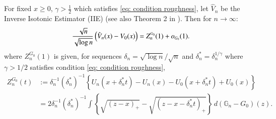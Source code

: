     \begin{lemma}\label{supp:lemma: asymptotic linearity iso estimator}
		For fixed $x \geq 0$, $\gamma > \frac{1}{2}$ which satisfies \eqref{eq: condition roughness}, let $\hat{V}_n$ be the Inverse Isotonic Estimator (IIE) (see also Theorem 2 in \cite{27}). Then for $n \rightarrow \infty$:
		\begin{align*}
			\frac{\sqrt{n}}{\sqrt{\log{n}}} \left( \hat{V}_n(x) - V_0(x) \right)= Z^{\scriptscriptstyle{G_0}}_n(1) +o_{\scaleto{G_{0}}{4.8pt}}(1).  
		\end{align*}
		where $ Z^{\scriptscriptstyle{G_0}}_n(1)$ is given, for sequences $\delta_n = \sqrt{\log{n}}/\sqrt{n}$ and $\delta_n^{*}=\delta_n^{1 / \gamma}$ where $\gamma >1 / 2$ satisfies condition \eqref{eq: condition roughness}, 
    \begin{align}\label{supp:eq: Z_n process}
        Z^{\scriptscriptstyle{G_0}}_n(t) & :=\delta_n^{-1}\left(\delta_n^*\right)^{-1}\left\{U_n\left(x+\delta_n^* t\right)-U_n(x)-U_0\left(x+\delta_n^* t\right)+U_0(x)\right\} \\
        & =2 \delta_n^{-1} (\delta^*_n)^{-1} \int\left\{\sqrt{(z-x)_+} -\sqrt{(z-x-\delta^*_n t)_+} \right\} \, d\left(\mathbb{G}_n-G_0\right)(z).
    \end{align}
	\end{lemma}
